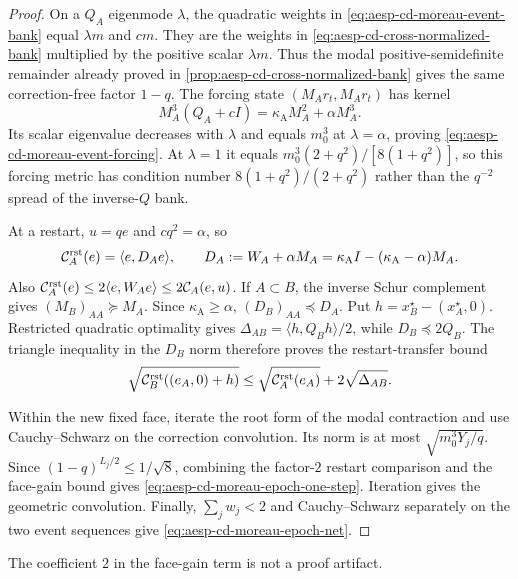 \begin{proof}
On a $Q_A$ eigenmode $\lambda$, the quadratic weights in
\eqref{eq:aesp-cd-moreau-event-bank} equal $\lambda m$ and $cm$.  They are the
weights in \eqref{eq:aesp-cd-cross-normalized-bank} multiplied by the positive
scalar $\lambda m$.  Thus the modal positive-semidefinite remainder already
proved in \cref{prop:aesp-cd-cross-normalized-bank} gives the same
correction-free factor $1-q$.  The forcing state $(M_Ar_t,M_Ar_t)$ has kernel
\[
 M_A^3(Q_A+cI)=\kappa_{\mathrm A}M_A^2+\alpha M_A^3.
\]
Its scalar eigenvalue decreases with $\lambda$ and equals $m_0^3$ at
$\lambda=\alpha$, proving \eqref{eq:aesp-cd-moreau-event-forcing}.  At
$\lambda=1$ it equals
$m_0^3(2+q^2)/[8(1+q^2)]$, so this forcing metric has condition number
$8(1+q^2)/(2+q^2)$ rather than the $q^{-2}$ spread of the inverse-$Q$ bank.

At a restart, $u=qe$ and $cq^2=\alpha$, so
\begin{equation*}
 \mathcal C_A^{\rm rst}(e)
 =\langle e,D_Ae\rangle,
 \qquad
 D_A:=W_A+\alpha M_A
 =\kappa_{\mathrm A}I-(\kappa_{\mathrm A}-\alpha)M_A.
\end{equation*}
Also $\mathcal C_A^{\rm rst}(e)\leq2\langle e,W_Ae\rangle
\leq2\mathcal C_A(e,u)$.  If $A\subset B$, the inverse Schur complement gives
$(M_B)_{AA}\succeq M_A$.  Since $\kappa_{\mathrm A}\geq\alpha$,
$(D_B)_{AA}\preceq D_A$.  Put
$h=x_B^\star-(x_A^\star,0)$.  Restricted quadratic optimality gives
$\Delta_{AB}=\langle h,Q_Bh\rangle/2$, while $D_B\preceq2Q_B$.  The triangle
inequality in the $D_B$ norm therefore proves the restart-transfer bound
\begin{equation*}
 \sqrt{\mathcal C_B^{\rm rst}((e_A,0)+h)}
 \leq\sqrt{\mathcal C_A^{\rm rst}(e_A)}+2\sqrt{\Delta_{AB}}.
\end{equation*}

Within the new fixed face, iterate the root form of the modal contraction and
use Cauchy--Schwarz on the correction convolution.  Its norm is at most
$\sqrt{m_0^3Y_j/q}$.  Since
$(1-q)^{L_j/2}\leq1/\sqrt8$, combining the factor-$2$ restart comparison and
the face-gain bound gives \eqref{eq:aesp-cd-moreau-epoch-one-step}.  Iteration
gives the geometric convolution.  Finally, $\sum_jw_j<2$ and
Cauchy--Schwarz separately on the two event sequences give
\eqref{eq:aesp-cd-moreau-epoch-net}.
\end{proof}

The coefficient $2$ in the face-gain term is not a proof artifact.


